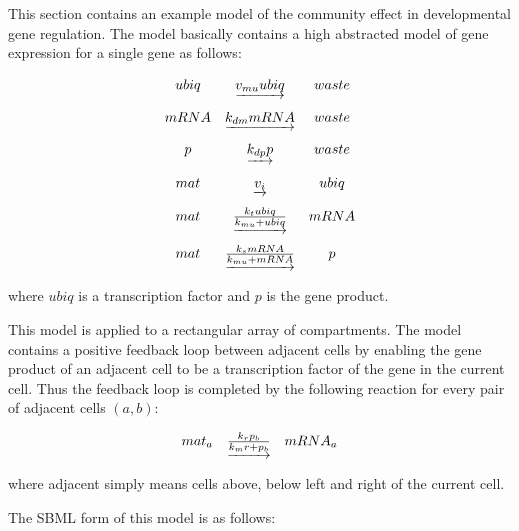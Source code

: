 \documentclass{cekarticle}
\begin{document}
This section contains an example model of the community effect in
developmental gene regulation. The model basically contains a
high abstracted model of gene expression for a single gene as follows:

\begin{equation*}
  \begin{array}{@{}ccc@{}}
    ubiq & \underrightarrow{v_{mu} ubiq} & waste \\ \\[-4pt]
    mRNA & \underrightarrow{k_{dm} mRNA} & waste \\ \\[-4pt]
    p & \underrightarrow{k_{dp} p} & waste \\ \\[-4pt]
    mat & \underrightarrow{v_i} & ubiq \\ \\[-4pt]
    mat & \underrightarrow{\frac{k_t ubiq}{k_{mu} + ubiq}} & mRNA \\ \\[-4pt]
    mat & \underrightarrow{\frac{k_s mRNA}{k_{mu} + mRNA}} & p
  \end{array}
\end{equation*}

where $ubiq$ is a transcription factor and $p$ is the gene product.

This model is applied to a rectangular array of compartments. The
model contains a positive feedback loop between adjacent cells by
enabling the gene product of an adjacent cell to be a
transcription factor of the gene in the current cell. Thus the
feedback loop is completed by the following reaction for every
pair of adjacent cells $(a,b)$:

\begin{equation*}
  \begin{array}{@{}ccc@{}}
    mat_a & \underrightarrow{\frac{k_r p_b}{k_mr + p_b}} & mRNA_a
  \end{array}
\end{equation*}

where adjacent simply means cells above, below left and right of
the current cell.

The SBML form of this model is as follows:
\end{document}
